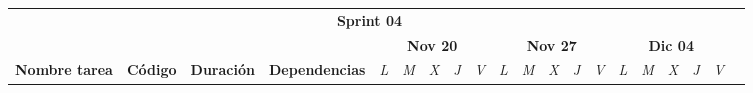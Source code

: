 \begin{longtable}[c]{llclllllllllllllllll}
        \multicolumn{19}{|c|}{\cellcolor[HTML]{8EA9D8}\textbf{Sprint 04}}                                                                                                                                                                                                                                                                                                                                                                                                                                                                                                                                                                                                                                                                                                                                                                                                                                                              &  \\ \cline{1-19}
        \multicolumn{1}{|c|}{}                                                                                                  & \multicolumn{1}{c|}{}                                                          & \multicolumn{1}{c|}{}                                                            & \multicolumn{1}{c|}{}                                                                & \multicolumn{5}{c|}{\textbf{Nov 20}}                                                                                                                                    & \multicolumn{5}{c|}{\textbf{Nov 27}}                                                                                                                                    & \multicolumn{5}{c|}{\textbf{Dic 04}}                                                                                                                                                  &  \\ \cline{5-19}
        \multicolumn{1}{|c|}{\multirow{-2}{*}{\textbf{Nombre tarea}}}                                                           & \multicolumn{1}{c|}{\multirow{-2}{*}{\textbf{Código}}}                         & \multicolumn{1}{c|}{\multirow{-2}{*}{\textbf{Duración}}}                         & \multicolumn{1}{c|}{\multirow{-2}{*}{\textbf{Dependencias}}}                         & \multicolumn{1}{l|}{\textit{L}} & \multicolumn{1}{l|}{\textit{M}} & \multicolumn{1}{l|}{\textit{X}} & \multicolumn{1}{l|}{\textit{J}} & \multicolumn{1}{l|}{\textit{V}} & \multicolumn{1}{l|}{\textit{L}} & \multicolumn{1}{l|}{\textit{M}} & \multicolumn{1}{l|}{\textit{X}} & \multicolumn{1}{l|}{\textit{J}} & \multicolumn{1}{l|}{\textit{V}} & \multicolumn{1}{l|}{\textit{L}} & \multicolumn{1}{l|}{\textit{M}} & \multicolumn{1}{l|}{\textit{X}} & \multicolumn{1}{l|}{\textit{J}} & \multicolumn{1}{l|}{\textit{V}}               &  \\ \cline{1-19}

\end{longtable}
